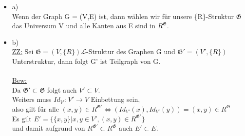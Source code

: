 \documentclass[a4paper]{scrartcl}
\begin{document}
    \begin{itemize}
        \item a)\\
            Wenn der Graph G = (V,E) ist, dann wählen wir für unsere \{R\}-Struktur $\mathfrak{G}$ das Universum V und alle Kanten aus E sind in $R^{\mathfrak{G}}$.\\

        \item b)\\
            \underline{ZZ:} Sei $\mathfrak{G} = (V, \{R\}) \mathscr{L}$-Struktur des Graphen G und $\mathfrak{G'} = (V', \{R\})$ Unterstruktur, dann folgt G' ist Teilgraph von G.\\
            \\\underline{Bew:}\\
                Da $\mathfrak{G'} \subset \mathfrak{G}$ folgt auch $V' \subset V$.\\
                Weiters muss $Id_{V'}: V' \rightarrow V$ Einbettung sein,\\
                also gilt für alle $(x,y) \in R^\mathfrak{G'} \Leftrightarrow  (Id_{V'}(x), Id_{V'}(y)) = (x,y) \in R^\mathfrak{G}$\\
                Es gilt $E' = \{\{x,y\} | x,y \in V', (x,y) \in R^{\mathfrak{G'}}\}$\\
                und damit aufgrund von $R^{\mathfrak{G'}} \subset R^{\mathfrak{G}}$ auch $E' \subset E$.\\


\end{itemize}
\end{document}
